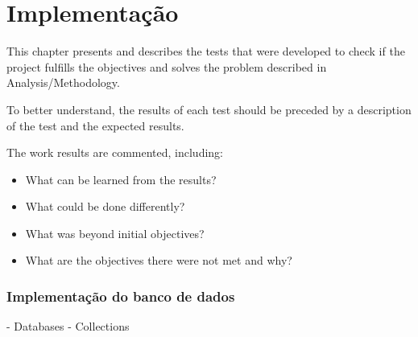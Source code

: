 




\chapter{Implementação}\label{cap:implementation}

This chapter presents and describes the tests that were developed to check if the project fulfills the objectives and solves the problem described in Analysis/Methodology.

To better understand, the results of each test should be preceded by a description of the test and the expected results.

The work results are commented, including:

\begin{itemize}
	\item  What can be learned from the results?
	\item What could be done differently? 
	\item What was beyond initial objectives?
	\item What are the objectives there were not met and why?
\end{itemize}


\subsection[Implementação do banco de dados]{Implementação do banco de dados}
- Databases
- Collections

